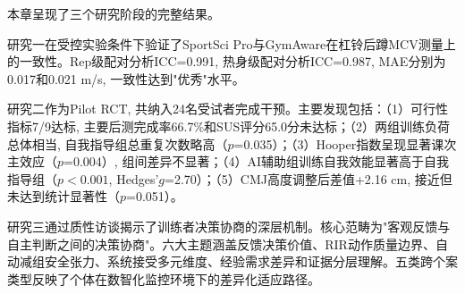 本章呈现了三个研究阶段的完整结果。

研究一在受控实验条件下验证了SportSci Pro与GymAware在杠铃后蹲MCV测量上的一致性。Rep级配对分析ICC=0.991, 热身级配对分析ICC=0.987, MAE分别为0.017和0.021 m/s, 一致性达到"优秀"水平。

研究二作为Pilot RCT, 共纳入24名受试者完成干预。主要发现包括：（1）可行性指标7/9达标, 主要后测完成率66.7\%和SUS评分65.0分未达标；（2）两组训练负荷总体相当, 自我指导组总重复次数略高（$p$=0.035）；（3）Hooper指数呈现显著课次主效应（$p$=0.004）, 组间差异不显著；（4）AI辅助组训练自我效能显著高于自我指导组（$p<0.001$, Hedges'$g$=2.70）；（5）CMJ高度调整后差值+2.16 cm, 接近但未达到统计显著性（$p$=0.051）。

研究三通过质性访谈揭示了训练者决策协商的深层机制。核心范畴为"客观反馈与自主判断之间的决策协商"。六大主题涵盖反馈决策价值、RIR动作质量边界、自动减组安全张力、系统接受多元维度、经验需求差异和证据分层理解。五类跨个案类型反映了个体在数智化监控环境下的差异化适应路径。
